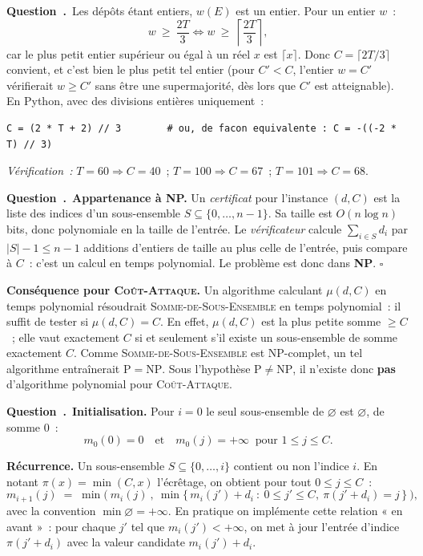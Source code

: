 \documentclass[11pt,a4paper]{article}
\renewcommand{\Q}{\medskip\par\stepcounter{qcnt}\noindent\textbf{\color{cnc}Question~\theqcnt.}~}
\begin{document}
\Q Les dépôts étant entiers, $w(E)$ est un entier. Pour un entier $w$~:
\[ w\ \ge\ \frac{2T}{3} \iff w\ \ge\ \left\lceil \frac{2T}{3}\right\rceil, \]
car le plus petit entier supérieur ou égal à un réel $x$ est $\lceil x\rceil$. Donc
$C=\lceil 2T/3\rceil$ convient, et c'est bien le plus petit tel entier (pour $C'<C$, l'entier
$w=C'$ vérifierait $w\ge C'$ sans être une supermajorité, dès lors que $C'$ est atteignable).
En Python, avec des divisions entières uniquement~:
\begin{lstlisting}
C = (2 * T + 2) // 3        # ou, de facon equivalente : C = -((-2 * T) // 3)
\end{lstlisting}
\emph{Vérification~:} $T=60\Rightarrow C=40$~; $T=100\Rightarrow C=67$~; $T=101\Rightarrow
C=68$.

\Q \textbf{Appartenance à NP.} Un \emph{certificat} pour l'instance $(d,C)$ est la liste des
indices d'un sous-ensemble $S\subseteq\{0,\dots,n-1\}$. Sa taille est $O(n\log n)$ bits, donc
polynomiale en la taille de l'entrée. Le \emph{vérificateur} calcule $\sum_{i\in S}d_i$ par
$|S|-1\le n-1$ additions d'entiers de taille au plus celle de l'entrée, puis compare à $C$~:
c'est un calcul en temps polynomial. Le problème est donc dans \textbf{NP}. \hfill$\square$

\textbf{Conséquence pour \textsc{Coût-Attaque}.} Un algorithme calculant $\mu(d,C)$ en temps
polynomial résoudrait \textsc{Somme-de-Sous-Ensemble} en temps polynomial~: il suffit de
tester si $\mu(d,C)=C$. En effet, $\mu(d,C)$ est la plus petite somme $\ge C$~; elle vaut
exactement $C$ si et seulement s'il existe un sous-ensemble de somme exactement $C$. Comme
\textsc{Somme-de-Sous-Ensemble} est NP-complet, un tel algorithme entraînerait
$\mathrm{P}=\mathrm{NP}$. Sous l'hypothèse $\mathrm{P}\ne\mathrm{NP}$, il n'existe donc
\textbf{pas} d'algorithme polynomial pour \textsc{Coût-Attaque}.

\Q \textbf{Initialisation.} Pour $i=0$ le seul sous-ensemble de $\varnothing$ est
$\varnothing$, de somme $0$~:
\[ m_0(0)=0 \quad\text{et}\quad m_0(j)=+\infty \ \text{ pour } 1\le j\le C. \]

\textbf{Récurrence.} Un sous-ensemble $S\subseteq\{0,\dots,i\}$ contient ou non l'indice $i$.
En notant $\pi(x)=\min(C,x)$ l'écrêtage, on obtient pour tout $0\le j\le C$~:
\[ m_{i+1}(j) \;=\; \min\Big(\ m_i(j)\ ,\
\min\big\{\,m_i(j')+d_i \ :\ 0\le j'\le C,\ \pi(j'+d_i)=j\,\big\}\ \Big), \]
avec la convention $\min\varnothing=+\infty$. En pratique on implémente cette relation
« en avant »~: pour chaque $j'$ tel que $m_i(j')<+\infty$, on met à jour l'entrée d'indice
$\pi(j'+d_i)$ avec la valeur candidate $m_i(j')+d_i$.
\end{document}
